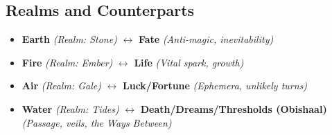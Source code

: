 \subsection*{Realms and Counterparts}\label{subsec:realms-counterparts}
\begin{itemize}
\item \textbf{Earth} \emph{(Realm: Stone)} $\leftrightarrow$ \textbf{Fate} \emph{(Anti-magic, inevitability)}
\item \textbf{Fire} \emph{(Realm: Ember)} $\leftrightarrow$ \textbf{Life} \emph{(Vital spark, growth)}
\item \textbf{Air} \emph{(Realm: Gale)} $\leftrightarrow$ \textbf{Luck/Fortune} \emph{(Ephemera, unlikely turns)}
\item \textbf{Water} \emph{(Realm: Tides)} $\leftrightarrow$ \textbf{Death/Dreams/Thresholds (Obishaal)} \emph{(Passage, veils, the Ways Between)}
\end{itemize}

\vspace{0.5em}

